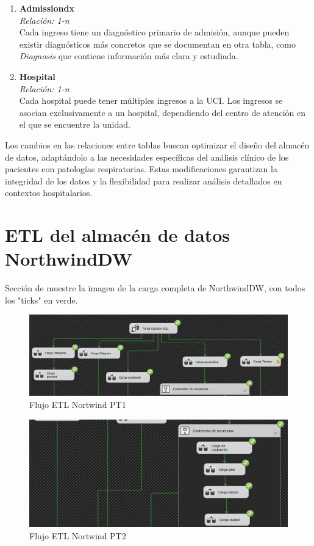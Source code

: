 \documentclass[12pt, a4paper, twoside]{article}
\begin{document}
\begin{enumerate}
		\item \textbf{Admissiondx} \\
		\textit{Relación: 1-n} \\
		Cada ingreso tiene un diagnóstico primario de admisión, aunque pueden existir diagnósticos  más concretos que se documentan en otra tabla, como \textit{Diagnosis} que contiene información más clara y estudiada.
		
		\item \textbf{Hospital} \\
		\textit{Relación: 1-n} \\
		Cada hospital puede tener múltiples ingresos a la UCI. Los ingresos se asocian exclusivamente a un hospital, dependiendo del centro de atención en el que se encuentre la unidad.
	\end{enumerate}
	
	Los cambios en las relaciones entre tablas buscan optimizar el diseño del almacén de datos, adaptándolo a las necesidades específicas del análisis clínico de los pacientes con patologías respiratorias. Estas modificaciones garantizan la integridad de los datos y la flexibilidad para realizar análisis detallados en contextos hospitalarios. 
	
	
	\section{ETL del almacén de datos NorthwindDW}
	
	Sección de muestre la imagen de la carga completa de NorthwindDW, con todos los "ticks" en verde. 
	
	\begin{figure}[h!]
		\centering
		\includegraphics[width=1\textwidth]{image/flujo_north_1.png}
		\caption{Flujo ETL Nortwind PT1}
		\label{fig:5}
	\end{figure}
	
	\begin{figure}[h!]
		\centering
		\includegraphics[width=1\textwidth]{image/flujo_north_2.png}
		\caption{Flujo ETL Nortwind PT2}
		\label{fig:6}
	\end{figure}
	
\end{document}
